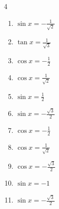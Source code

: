 \begin{multicols}{4}
\begin{enumerate}
  \item $\displaystyle \sin{x}  = -\frac{1}{\sqrt{2}}$


  \item $\displaystyle \tan{x}  = \frac{1}{\sqrt{3}}$


  \item $\displaystyle \cos{x}  = -\frac{1}{2}$


  \item $\displaystyle \cos{x}  = \frac{1}{\sqrt{2}}$


  \item $\displaystyle \sin{x}  = \frac{1}{2}$


  \item $\displaystyle \sin{x}  = -\frac{\sqrt{3}}{2}$


  \item $\displaystyle \cos{x}  = -\frac{1}{2}$


  \item $\displaystyle \cos{x}  = \frac{1}{\sqrt{2}}$


  \item $\displaystyle \cos{x}  = -\frac{\sqrt{3}}{2}$


  \item $\displaystyle \sin{x}  = -1$


  \item $\displaystyle \sin{x}  = -\frac{\sqrt{3}}{2}$


\columnbreak %


\end{enumerate}
\end{multicols}
